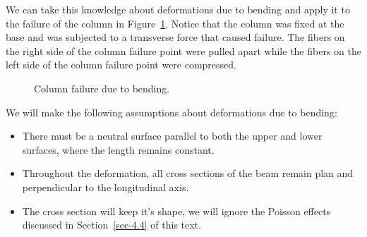 \documentclass[
  letterpaper,
  DIV=11,
  numbers=noendperiod]{scrreprt}
\theoremstyle{definition}
\theoremstyle{remark}
\begin{document}
We can take this knowledge about deformations due to bending and apply
it to the failure of the column in Figure~\ref{fig-9.5}. Notice that the
column was fixed at the base and was subjected to a transverse force
that caused failure. The fibers on the right side of the column failure
point were pulled apart while the fibers on the left side of the column
failure point were compressed.

\begin{figure}


\caption{\label{fig-9.5}Column failure due to bending.}

\end{figure}%

We will make the following assumptions about deformations due to
bending:

\begin{itemize}
\item
  There must be a neutral surface parallel to both the upper and lower
  surfaces, where the length remains constant.
\item
  Throughout the deformation, all cross sections of the beam remain plan
  and perpendicular to the longitudinal axis.
\item
  The cross section will keep it's shape, we will ignore the Poisson
  effects discussed in Section~\ref{sec-4.4} of this text.
\end{itemize}
\end{document}
